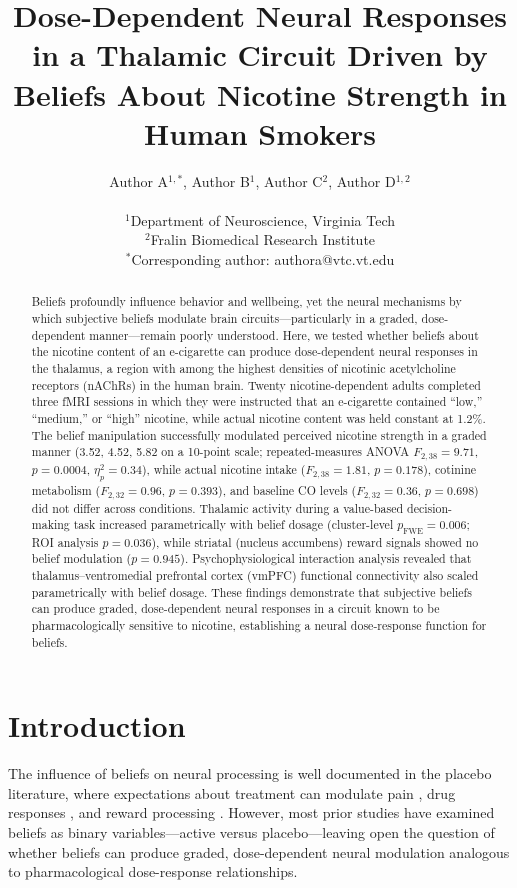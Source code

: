 \documentclass[11pt]{article}
\title{Dose-Dependent Neural Responses in a Thalamic Circuit Driven by Beliefs About Nicotine Strength in Human Smokers}
\author{
Author A$^{1,*}$, Author B$^{1}$, Author C$^{2}$, Author D$^{1,2}$ \\
\\
$^{1}$Department of Neuroscience, Virginia Tech \\
$^{2}$Fralin Biomedical Research Institute \\
$^{*}$Corresponding author: authora@vtc.vt.edu
}
\date{}
\begin{document}
\maketitle

\begin{abstract}
Beliefs profoundly influence behavior and wellbeing, yet the neural mechanisms by which subjective beliefs modulate brain circuits---particularly in a graded, dose-dependent manner---remain poorly understood. Here, we tested whether beliefs about the nicotine content of an e-cigarette can produce dose-dependent neural responses in the thalamus, a region with among the highest densities of nicotinic acetylcholine receptors (nAChRs) in the human brain. Twenty nicotine-dependent adults completed three fMRI sessions in which they were instructed that an e-cigarette contained ``low,'' ``medium,'' or ``high'' nicotine, while actual nicotine content was held constant at 1.2\%. The belief manipulation successfully modulated perceived nicotine strength in a graded manner (3.52, 4.52, 5.82 on a 10-point scale; repeated-measures ANOVA $F_{2,38} = 9.71$, $p = 0.0004$, $\eta_p^2 = 0.34$), while actual nicotine intake ($F_{2,38} = 1.81$, $p = 0.178$), cotinine metabolism ($F_{2,32} = 0.96$, $p = 0.393$), and baseline CO levels ($F_{2,32} = 0.36$, $p = 0.698$) did not differ across conditions. Thalamic activity during a value-based decision-making task increased parametrically with belief dosage (cluster-level $p_{\mathrm{FWE}} = 0.006$; ROI analysis $p = 0.036$), while striatal (nucleus accumbens) reward signals showed no belief modulation ($p = 0.945$). Psychophysiological interaction analysis revealed that thalamus--ventromedial prefrontal cortex (vmPFC) functional connectivity also scaled parametrically with belief dosage. These findings demonstrate that subjective beliefs can produce graded, dose-dependent neural responses in a circuit known to be pharmacologically sensitive to nicotine, establishing a neural dose-response function for beliefs.
\end{abstract}

\section{Introduction}

The influence of beliefs on neural processing is well documented in the placebo literature, where expectations about treatment can modulate pain \citep{wager2004, petrovic2002, atlas2012}, drug responses \citep{volkow2003}, and reward processing \citep{gu2015}. However, most prior studies have examined beliefs as binary variables---active versus placebo---leaving open the question of whether beliefs can produce graded, dose-dependent neural modulation analogous to pharmacological dose-response relationships.
\end{document}
